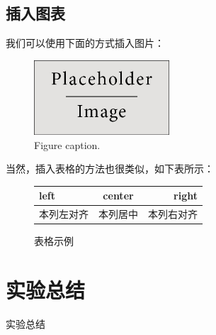 \documentclass[hyperref,UTF8]{ctexart}
\begin{document}
\subsection{插入图表}

我们可以使用下面的方式插入图片：

\begin{figure}[H]
\centering
\includegraphics[width=0.45\textwidth,height=0.25\textwidth]{placeholder} %
\caption{Figure caption.}
\label{fig:image}
\end{figure}

当然，插入表格的方法也很类似，如下表所示：

\begin{figure}[H]
\centering
\begin{tabular}{|l|c|r|}
\hline
left & center & right	\\
\hline
本列左对齐 & 本列居中 & 本列右对齐	\\
\hline
\end{tabular}
\caption{表格示例}
\end{figure}


\section{实验总结}

实验总结






\end{document}
